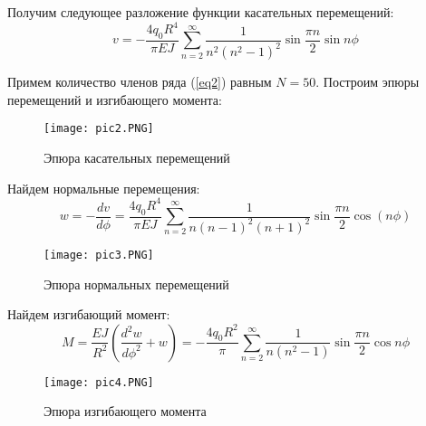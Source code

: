 Получим следующее разложение функции касательных перемещений:
\begin{equation}
    \label{eq12.8}
    v = -\frac{4q_0R^4}{\pi EJ} \sum_{n=2}^{\infty} \frac{1}{n^2(n^2 - 1)^2} \sin \frac{\pi n}{2} \sin n\phi
\end{equation}

Примем количество членов ряда (\ref{eq2}) равным $N = 50$. Построим эпюры перемещений и изгибающего момента:
\begin{figure}[H]
    \begin{center}
        \texttt{[image: pic2.PNG]}
        \caption{Эпюра касательных перемещений}
        \label{pic2}
    \end{center}
\end{figure}

Найдем нормальные перемещения:
\begin{equation}
    \label{eq13}
    w = - \frac{dv}{d\phi} = \frac{4q_0R^4}{\pi EJ} \sum_{n=2}^{\infty} \frac{1}{n(n - 1)^2(n + 1)^2} \sin \frac{\pi n}{2} \cos(n \phi)
\end{equation}

\begin{figure}[H]
    \begin{center}
        \texttt{[image: pic3.PNG]}
        \caption{Эпюра нормальных перемещений}
        \label{pic3}
    \end{center}    
\end{figure}

Найдем изгибающий момент:
\begin{equation}
    \label{eq14}
    M = \frac{EJ}{R^2} \left(\frac{d^2 w}{d \phi^2} + w \right) = -\frac{4q_0R^2}{\pi} \sum_{n=2}^{\infty} \frac{1}{n(n^2 - 1)} \sin \frac{\pi n}{2} \cos n\phi
\end{equation}

\begin{figure}[H]
    \begin{center}
        \texttt{[image: pic4.PNG]}
        \caption{Эпюра изгибающего момента}
        \label{pic4}
    \end{center}
\end{figure}

